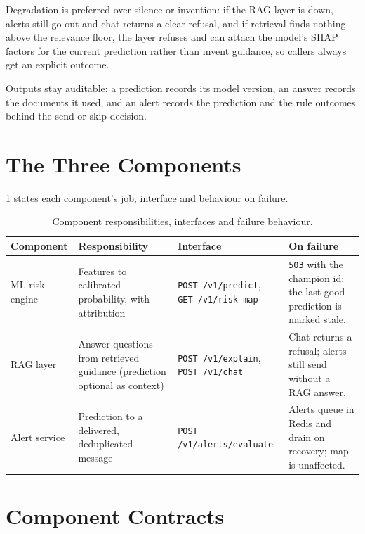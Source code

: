 \documentclass[10pt,openany]{report}
\begin{document}
Degradation is preferred over silence or invention: if the RAG layer is down, alerts still go out and
chat returns a clear refusal, and if retrieval finds nothing above the relevance floor, the layer
refuses and can attach the model's SHAP factors for the current prediction rather than invent
guidance, so callers always get an explicit outcome.

Outputs stay auditable: a prediction records its model version, an answer records the documents it
used, and an alert records the prediction and the rule outcomes behind the send-or-skip decision.

\section{The Three Components}

\cref{tab:components} states each component's job, interface and behaviour on failure.

\begin{table}[htbp]
\centering
\caption{Component responsibilities, interfaces and failure behaviour.}
\label{tab:components}
\small
\begin{tabular}{@{}>{\raggedright\arraybackslash}p{2.2cm}>{\raggedright\arraybackslash}p{3.6cm}>{\raggedright\arraybackslash}p{3.4cm}>{\raggedright\arraybackslash}p{4.2cm}@{}}
\toprule
\textbf{Component} & \textbf{Responsibility} & \textbf{Interface} & \textbf{On failure} \\
\midrule
ML risk engine & Features to calibrated probability, with attribution & \texttt{POST /v1/predict}, \texttt{GET /v1/risk-map} & \texttt{503} with the champion id; the last good prediction is marked stale. \\
RAG layer & Answer questions from retrieved guidance (prediction optional as context) & \texttt{POST /v1/explain}, \texttt{POST /v1/chat} & Chat returns a refusal; alerts still send without a RAG answer. \\
Alert service & Prediction to a delivered, deduplicated message & \texttt{POST /v1/alerts/evaluate} & Alerts queue in Redis and drain on recovery; map is unaffected. \\
\bottomrule
\end{tabular}
\end{table}

\section{Component Contracts}
\end{document}
